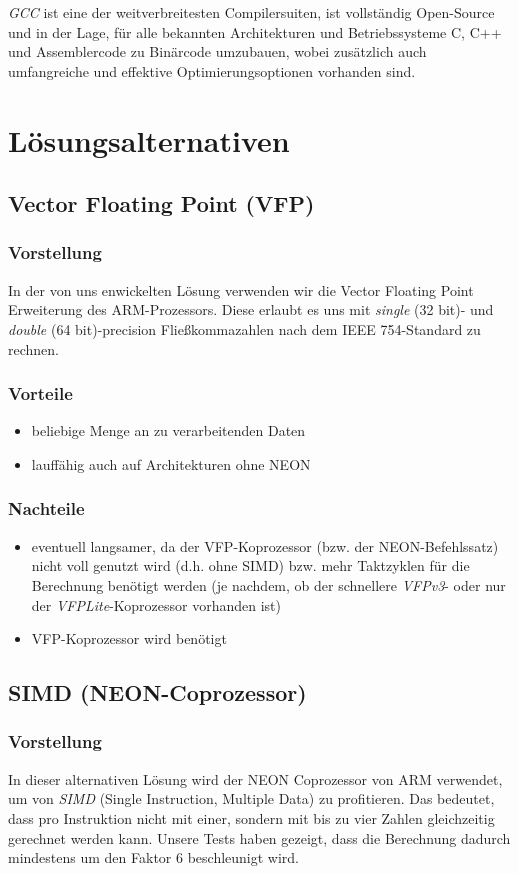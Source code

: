 \documentclass[11pt]{scrartcl}
\begin{document}
\emph{GCC} ist eine der weitverbreitesten Compilersuiten, ist vollständig Open-Source und in der Lage, für alle bekannten Architekturen und Betriebssysteme C, C++ und Assemblercode zu Binärcode umzubauen, wobei zusätzlich auch umfangreiche und effektive Optimierungsoptionen vorhanden sind.

\section{Lösungsalternativen}
\subsection{Vector Floating Point (VFP)}
\subsubsection*{Vorstellung}
In der von uns enwickelten Lösung verwenden wir die Vector Floating Point Erweiterung des ARM-Prozessors. 
Diese erlaubt es uns mit \emph{single} (32 bit)- und \emph{double} (64 bit)-precision Fließkommazahlen nach dem IEEE 754-Standard zu rechnen.
\subsubsection*{Vorteile}
\begin{itemize}
\item beliebige Menge an zu verarbeitenden Daten
\item lauffähig auch auf Architekturen ohne NEON
\end{itemize}
\subsubsection*{Nachteile}
\begin{itemize}
\item eventuell langsamer, da der VFP-Koprozessor (bzw. der NEON-Befehlssatz) nicht voll genutzt wird (d.h. ohne SIMD) bzw. mehr Taktzyklen für die Berechnung benötigt werden (je nachdem, ob der schnellere \emph{VFPv3}- oder nur der \emph{VFPLite}-Koprozessor vorhanden ist)
\item VFP-Koprozessor wird benötigt
\end{itemize}
\subsection{SIMD (NEON-Coprozessor)}
\subsubsection*{Vorstellung}
In dieser alternativen Lösung wird der NEON Coprozessor von ARM verwendet, um von \emph{SIMD} (Single Instruction, Multiple Data)
zu profitieren. Das bedeutet, dass pro Instruktion nicht mit einer, sondern mit bis zu vier Zahlen gleichzeitig gerechnet werden kann. Unsere Tests haben gezeigt, dass die Berechnung dadurch mindestens um den Faktor 6 beschleunigt wird.
\end{document}
